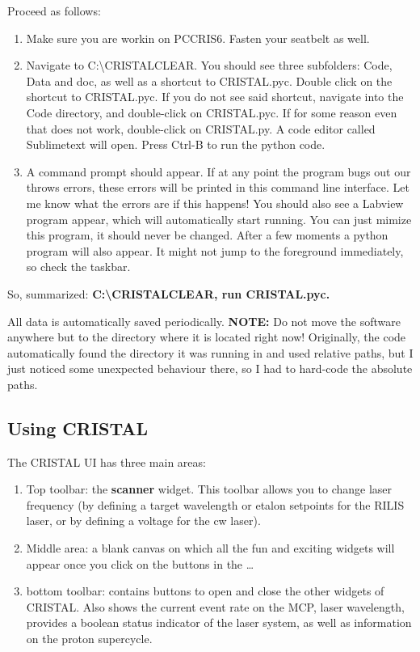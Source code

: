 \documentclass[10pt,a4paper]{article}
\begin{document}
Proceed as follows:
\begin{enumerate}
    \item Make sure you are workin on PCCRIS6. Fasten your seatbelt as well.
    \item Navigate to C:\textbackslash CRISTALCLEAR. You should see three subfolders: Code, Data and doc, as well as a shortcut to CRISTAL.pyc. Double click on the shortcut to CRISTAL.pyc. If you do not see said shortcut, navigate into the Code directory, and double-click on CRISTAL.pyc. If for some reason even that does not work, double-click on CRISTAL.py. A code editor called Sublimetext will open. Press Ctrl-B to run the python code.
    \item A command prompt should appear. If at any point the program bugs out our throws errors, these errors will be printed in this command line interface. Let me know what the errors are if this happens! You should also see a Labview program appear, which will automatically start running. You can just mimize this program, it should never be changed. After a few moments a python program will also appear. It might not jump to the foreground immediately, so check the taskbar. 
\end{enumerate}

So, summarized: \textbf{C:\textbackslash CRISTALCLEAR, run CRISTAL.pyc.}

All data is automatically saved periodically. \textbf{NOTE:} Do not move the software anywhere but to the directory where it is located right now! Originally, the code automatically found the directory it was running in and used relative paths, but I just noticed some unexpected behaviour there, so I had to hard-code the absolute paths.


\subsection{Using CRISTAL}

The CRISTAL UI has three main areas: 
\begin{enumerate}
    \item Top toolbar: the \textbf{scanner} widget. This toolbar allows you to change laser frequency (by defining a target wavelength or etalon setpoints for the RILIS laser, or by defining a voltage for the cw laser).
    \item Middle area: a blank canvas on which all the fun and exciting widgets will appear once you click on the buttons in the \ldots
    \item bottom toolbar: contains buttons to open and close the other widgets of CRISTAL. Also shows the current event rate on the MCP, laser wavelength, provides a boolean status indicator of the laser system, as well as information on the proton supercycle.
\end{enumerate}
\end{document}
